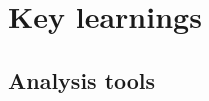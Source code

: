 \documentclass[9pt,bestpractices,pubversion]{livecoms}
\begin{document}




\section{Key learnings}
\label{sec:key_learnings}

\subsection{Analysis tools}
\label{sec:analysis_tools}
\end{document}
